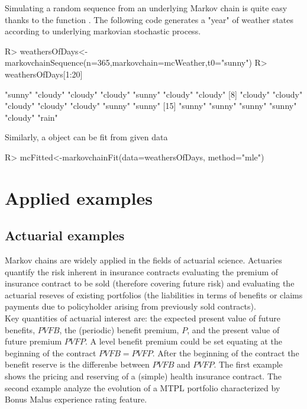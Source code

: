 \documentclass[nojss]{jss}
\begin{document}
Simulating a random sequence from an underlying Markov chain is quite easy thanks to the function .
The following code generates a "year" of weather states according to \cite{mcWeather} underlying markovian stochastic process.

\begin{Schunk}
\begin{Sinput}
R> weathersOfDays<-markovchainSequence(n=365,markovchain=mcWeather,t0="sunny")
R> weathersOfDays[1:20]
\end{Sinput}
\begin{Soutput}
 [1] "sunny"  "cloudy" "cloudy" "cloudy" "sunny"  "cloudy" "cloudy"
 [8] "cloudy" "cloudy" "cloudy" "cloudy" "cloudy" "sunny"  "sunny" 
[15] "sunny"  "sunny"  "sunny"  "sunny"  "cloudy" "rain"  
\end{Soutput}
\end{Schunk}

Similarly, a  object can be fit from given data

\begin{Schunk}
\begin{Sinput}
R> mcFitted<-markovchainFit(data=weathersOfDays, method="mle")
\end{Sinput}
\end{Schunk}


\section{Applied examples}\label{sec:examples}

\subsection{Actuarial examples}

Markov chains are widely applied in the fields of actuarial science. Actuaries quantify the risk inherent in insurance contracts evaluating the premium of insurance contract to be sold (therefore covering future risk) and evaluating the actuarial reseves of existing portfolios (the liabilities in terms of benefits or claims payments due to policyholder arising from previously sold contracts).\\
Key quantities of actuarial interest are: the expected present value of future benefits, $PVFB$, the (periodic) benefit premium, $P$, and the present value of future premium $PVFP$. A level benefit premium could be set equating at the beginning of the contract $PVFB=PVFP$. After the beginning of the contract the benefit reserve is the differenbe between $PVFB$ and $PVFP$.
The first example shows the pricing and reserving of a (simple) health insurance contract. The second example analyze the evolution of a MTPL portfolio characterized by Bonus Malus experience rating feature.
\end{document}
